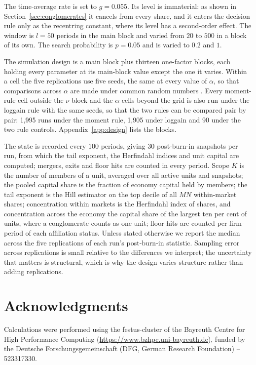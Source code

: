 \documentclass[12pt,a4paper]{article}
\begin{document}
The time-average rate is set to $g = 0.055$. Its level is immaterial: as shown in Section~\ref{sec:conglomerates} it cancels from every share, and it enters the decision rule only as the recentring constant, where its level has a second-order effect. The window is $l = 50$ periods in the main block and varied from $20$ to $500$ in a block of its own. The search probability is $p = 0.05$ and is varied to $0.2$ and $1$.




The simulation design is a main block plus thirteen one-factor blocks, each holding every parameter at its main-block value except the one it varies. Within a cell the five replications use five seeds, the same at every value of $\alpha$, so that comparisons across $\alpha$ are made under common random numbers \parencite{glasserman1992some}. Every moment-rule cell outside the $\nu$ block and the $\alpha$ cells beyond the grid is also run under the loggain rule with the same seeds, so that the two rules can be compared pair by pair: 1,995 runs under the moment rule, 1,905 under loggain and 90 under the two rule controls. Appendix~\ref{app:design} lists the blocks.

The state is recorded every $100$ periods, giving $30$ post-burn-in snapshots per run, from which the tail exponent, the Herfindahl indices and unit capital are computed; mergers, exits and floor hits are counted in every period. Scope $K$ is the number of members of a unit, averaged over all active units and snapshots; the pooled capital share is the fraction of economy capital held by members; the tail exponent is the Hill estimator on the top decile of all $MN$ within-market shares; concentration within markets is the Herfindahl index of shares, and concentration across the economy the capital share of the largest ten per cent of units, where a conglomerate counts as one unit; floor hits are counted per firm-period of each affiliation status. Unless stated otherwise we report the median across the five replications of each run's post-burn-in statistic. Sampling error across replications is small relative to the differences we interpret; the uncertainty that matters is structural, which is why the design varies structure rather than adding replications. 







\section*{Acknowledgments}
Calculations were performed using the festus-cluster of the Bayreuth Centre for High Performance Computing (\url{https://www.bzhpc.uni-bayreuth.de}), funded by the Deutsche Forschungsgemeinschaft (DFG, German Research Foundation) -- 523317330.
\end{document}
